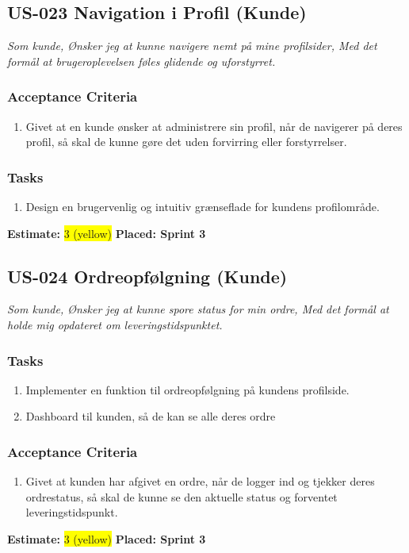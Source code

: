 \subsection{US-023 Navigation i Profil (Kunde)}
\label{sec:US-023}
\textit{Som kunde, Ønsker jeg at kunne navigere nemt på mine profilsider, Med det formål at brugeroplevelsen føles glidende og uforstyrret.}
\subsubsection*{\textbf{Acceptance Criteria}}
\begin{enumerate}
  \item Givet at en kunde ønsker at administrere sin profil, når de navigerer på deres profil, så skal de kunne gøre det uden forvirring eller forstyrrelser.
\end{enumerate}
\subsubsection*{\textbf{Tasks}}
\begin{enumerate}
  \item Design en brugervenlig og intuitiv grænseflade for kundens profilområde.
\end{enumerate}
\textbf{Estimate:} \colorbox{yellow}{3 (yellow)}
\textbf{Placed: Sprint 3}
\par\noindent\dotfill

\subsection{US-024 Ordreopfølgning (Kunde)}
\label{sec:US-024}
\textit{Som kunde, Ønsker jeg at kunne spore status for min ordre, Med det formål at holde mig opdateret om leveringstidspunktet.}
\subsubsection*{\textbf{Tasks}}
\begin{enumerate}
  \item Implementer en funktion til ordreopfølgning på kundens profilside.
  \item Dashboard til kunden, så de kan se alle deres ordre
\end{enumerate}
\subsubsection*{\textbf{Acceptance Criteria}}
\begin{enumerate}
  \item Givet at kunden har afgivet en ordre, når de logger ind og tjekker deres ordrestatus, så skal de kunne se den aktuelle status og forventet leveringstidspunkt.
\end{enumerate}
\textbf{Estimate:} \colorbox{yellow}{3 (yellow)}
\textbf{Placed: Sprint 3}
\par\noindent\dotfill

